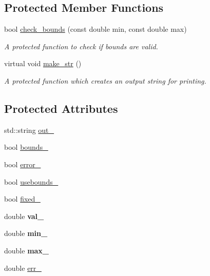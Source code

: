 \subsection*{Protected Member Functions}
\begin{DoxyCompactItemize}
\item 
bool \hyperlink{class_double_parameter_a342eae522e271c2a9f3ff28e3feb9bd7}{check\-\_\-bounds} (const double min, const double max)
\begin{DoxyCompactList}\small\item\em A protected function to check if bounds are valid. \end{DoxyCompactList}\item 
virtual void \hyperlink{class_double_parameter_a2ae1b8adff069cad50f4586292d3e19d}{make\-\_\-str} ()
\begin{DoxyCompactList}\small\item\em A protected function which creates an output string for printing. \end{DoxyCompactList}\end{DoxyCompactItemize}
\subsection*{Protected Attributes}
\begin{DoxyCompactItemize}
\item 
std\-::string \hyperlink{class_double_parameter_ad3c3e06213e3c1bd6290a592b0c2c021}{out\-\_\-}
\item 
bool \hyperlink{class_double_parameter_a08c6fd32e356cec94d0cc57a95cd9d9e}{bounds\-\_\-}
\item 
bool \hyperlink{class_double_parameter_a6b1d5b9ac1f8f3bb992a69f1c3e06edd}{error\-\_\-}
\item 
bool \hyperlink{class_double_parameter_af07ddf0264eb60d46dfef6536850e748}{usebounds\-\_\-}
\item 
bool \hyperlink{class_double_parameter_a579abb4fe62c4e9c7d3224241b4c9b67}{fixed\-\_\-}
\item 
\hypertarget{class_double_parameter_aa20191bc91e3c739c530d2046c13f59a}{double {\bfseries val\-\_\-}}\label{class_double_parameter_aa20191bc91e3c739c530d2046c13f59a}

\item 
\hypertarget{class_double_parameter_afff186438bcde2cd4e370f8b9cc7b6d2}{double {\bfseries min\-\_\-}}\label{class_double_parameter_afff186438bcde2cd4e370f8b9cc7b6d2}

\item 
\hypertarget{class_double_parameter_ae7a91745d7a5c2865eedb77496a8944c}{double {\bfseries max\-\_\-}}\label{class_double_parameter_ae7a91745d7a5c2865eedb77496a8944c}

\item 
double \hyperlink{class_double_parameter_a02ff8b300a991588e85d010940767d03}{err\-\_\-}
\end{DoxyCompactItemize}
